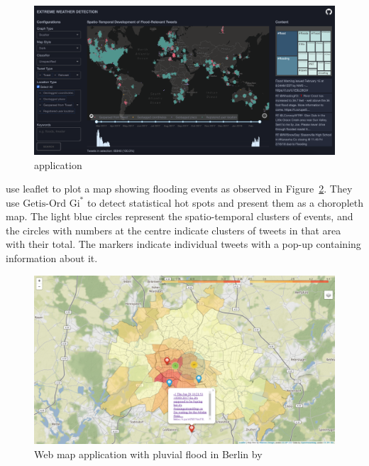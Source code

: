 \begin{figure}[H]
\begin{center}
  \includegraphics[width=\columnwidth]{./images/peter.png}
\end{center}
\caption{ application}
\label{fig:peter}
\end{figure}

 use leaflet to plot a map showing flooding events as
observed in Figure~\ref{fig:feng}. They use $\text{Getis-Ord Gi}^{\ast}$ \cite{ordLocalSpatialAutocorrelation2010}
to detect statistical hot spots and present them as a choropleth map. The light blue circles
represent the spatio-temporal clusters of events, and the circles with numbers at the centre
indicate clusters of tweets in that area with their total. The markers indicate individual tweets
with a pop-up containing information about it.

\begin{figure}[H]
\begin{center}
  \includegraphics[width=\columnwidth]{./images/feng.png}
\end{center}
\caption{Web map application with pluvial flood in Berlin by }
\label{fig:feng}
\end{figure}

